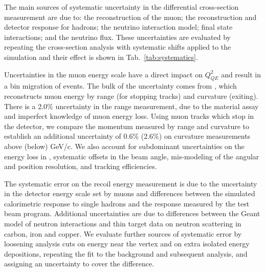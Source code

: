 


The main sources of systematic uncertainty in the differential
cross-section measurement are due to: the reconstruction of the muon;  
the reconstruction and detector response for hadrons; 
 the neutrino interaction model; final state interactions; 
and the neutrino flux.  These uncertainties are evaluated by 
repeating the cross-section analysis with systematic shifts 
applied to the simulation and their effect is shown in 
Tab.~\ref{tab:systematics}.

Uncertainties in the muon energy scale have a direct impact on $Q^{2}_{QE}$ and result in a bin migration of events. The bulk of the uncertainty comes from \minos, which reconstructs muon energy by range (for stopping tracks) and curvature (exiting). There is a 2.0\% uncertainty in the range measurement, due to the material assay and imperfect knowledge of muon energy loss\cite{Michael:2008bc}. Using muon tracks which stop in the detector, we compare the momentum measured by range and curvature to establish an additional uncertainty of 0.6\% (2.6\%) on curvature measurements above (below) \unit[1]{GeV/c}.
We also account for subdominant uncertainties on the  
 energy loss in \minerva, systematic offsets in the 
beam angle, mis-modeling of the angular and position resolution, 
and tracking efficiencies.

The systematic error on the recoil energy measurement is due to the
uncertainty in the \minerva detector energy scale set by muons and
differences between the simulated calorimetric response 
to single hadrons and the response measured by the test beam program.
Additional uncertainties are due to differences between the Geant model of
neutron interactions and thin target data on neutron scattering in
carbon, iron and copper\cite{Abfalterer:2001gw,Schimmerling:1973bb,Voss:1956,Slypen:1995fm,Franz:1989cf,Tippawan:2008xk,Bevilacqua:2013rfq,Zanelli:1981zz}.   We evaluate further sources of systematic error 
by loosening analysis cuts on energy near the vertex 
and on extra isolated energy depositions, repeating the 
fit to the background and subsequent analysis, and assigning
 an uncertainty to cover the difference.  

